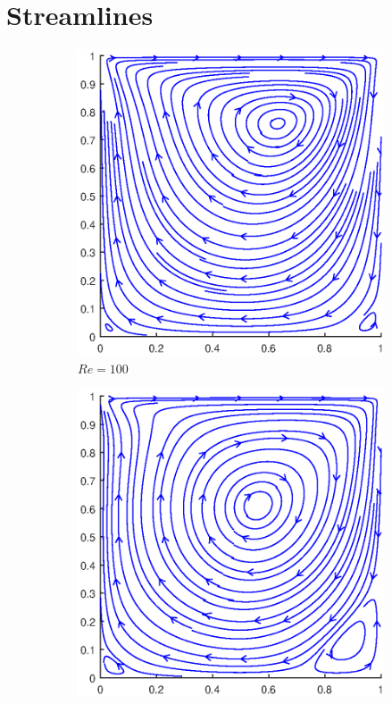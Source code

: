\section{Streamlines}
\begin{figure}[H]
	\centering
	\begin{subfigure}{0.5\textwidth}
		\includegraphics[scale=0.61]{DrivenCavity/100}
		\caption{$Re=100$}
	\end{subfigure}%
	\begin{subfigure}{0.5\textwidth}
		\includegraphics[scale=0.61]{DrivenCavity/400}

\end{subfigure}
\end{figure}
